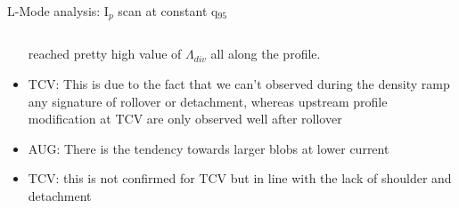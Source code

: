 \documentclass[10pt, compress]{beamer}
\begin{document}
\begin{frame}{L-Mode analysis: I$_p$ scan at constant q$_{95}$}
\begin{columns}
\begin{column}{0.35\textwidth}
\begin{itemize}
        reached pretty high value of $\Lambda_{div}$ all along the profile.
      \item<9|only@9> TCV: This is due to the fact that we can't
        observed during the density ramp any signature of rollover or detachment,
        whereas upstream profile modification at TCV are only observed
        well after rollover
      \item<10|only@10> AUG: There is the tendency towards larger blobs
        at lower current
      \item<11|only@11> TCV: this is not confirmed for TCV but in line
        with the lack of shoulder and detachment
      \end{itemize}
    \end{column}
\end{columns}
\end{frame}
\end{document}
